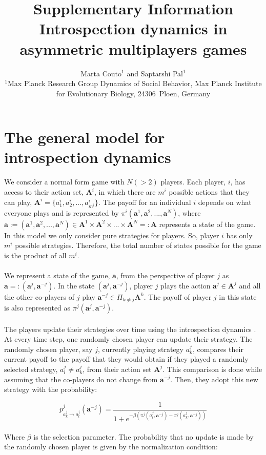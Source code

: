 \documentclass[11pt]{article}
\title{\sffamily \Large Supplementary Information\\[0.1cm] {\bfseries Introspection dynamics in asymmetric multiplayers games}}
\date{\empty}
\author{\parbox[c]{16cm}{\centering \onehalfspacing \fontsize{11}{12}\selectfont Marta Couto$^1$ and Saptarshi Pal$^1$\\[0.2cm]
$^1$Max Planck Research Group Dynamics of Social Behavior, Max Planck Institute for Evolutionary Biology, 24306~Ploen, Germany}}
\theoremstyle{plainCl1}
\theoremstyle{plainCl2}
\newcommand{\A}{\mathbf{A}}
\newcommand{\abf}{\mathbf{a}}
\begin{document}
\maketitle
\onehalfspacing
\section*{The general model for introspection dynamics}
We consider a normal form game with $N (>2)$ players. Each player, $i$, has access to their action set, $\A^i$, in which there are $m^i$ possible actions that they can play, $\A^i = \{a^i_1, a^i_2, ..., a^i_{m^i}\}$. The payoff for an individual $i$ depends on what everyone plays and is represented by $\pi^i(\abf^1, \abf^2, ..., \abf^N)$, where $\abf := (\abf^1, \abf^2,...,\abf^N) \in \A^1 \times \A^2 \times ... \times \A^N =: \A$ represents a state of the game. In this model we only consider pure strategies for players. So, player $i$ has only $m^i$ possible strategies. Therefore, the total number of states possible for the game is the product of all $m^i$. 
\\ \\
\noindent We represent a state of the game, $\abf$, from the perspective of player $j$ as $\abf =: (\abf^j, \abf^{-j})$. In the state $(\abf^j, \abf^{-j})$, player $j$ plays the action $\abf^j \in \A^j$ and all the other co-players of $j$ play $\abf^{-j} \in \Pi_{k \neq j} \A^k$. The payoff of player $j$ in this state is also represented as $\pi^j(\abf^j, \abf^{-j})$.
\\ \\
\noindent The players update their strategies over time using the introspection dynamics \cite{couto2022introspection}. At every time step, one randomly chosen player can update their strategy. The randomly chosen player, say $j$, currently playing strategy $a^j_k$, compares their current payoff to the payoff that they would obtain if they played a randomly selected strategy,  $a^j_l \neq a^j_k$, from their action set $\A^j$. This comparison is done while assuming that the co-players do not change from $\abf^{-j}$. Then, they adopt this new strategy  with the probability: 

\begin{equation}
 p^j_{a^j_k \to a^j_l} (\abf^{-j})= \frac{1}{1 + e^{\displaystyle -\beta(\pi^j(a^j_l, \abf^{-j}) - \pi^j(a^j_k, \abf^{-j}))}}
 \label{Eq:introspection-update}
\end{equation}
\\
\noindent Where $\beta$ is the selection parameter. The probability that no update is made by the randomly chosen player is given by the normalization condition: 
\end{document}
